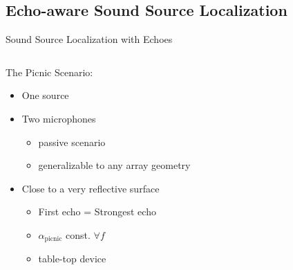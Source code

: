 \subsection{Echo-aware Sound Source Localization}

\begin{frame}[t]{Sound Source Localization \alert{with Echoes} \hfill\faMapMarked*}

    \vspace*{2mm}
    \begin{columns}[T,onlytextwidth]

        \begin{column}{0.5\textwidth}
            \begin{block}{The \alert{Picnic} Scenario:}
                \begin{itemize}
                    \small
                    \item<1-> One source
                    \item<1-> Two microphones
                    \begin{itemize}
                        \item<1->[$\rightarrow$] passive scenario
                        \item<1->[$\rightarrow$] generalizable to any array geometry
                    \end{itemize}
                    \item<2-> Close to a very reflective surface
                    \begin{itemize}
                        \item<2->[$\rightarrow$] First echo = Strongest echo
                        \item<2->[$\rightarrow$] $\alpha_\text{picnic}$ const. $\forall f$
                        \item<2->[$\rightarrow$] table-top device
                    \end{itemize}
                \end{itemize}
            \end{block}
        \end{column}


\end{columns}
\end{frame}
